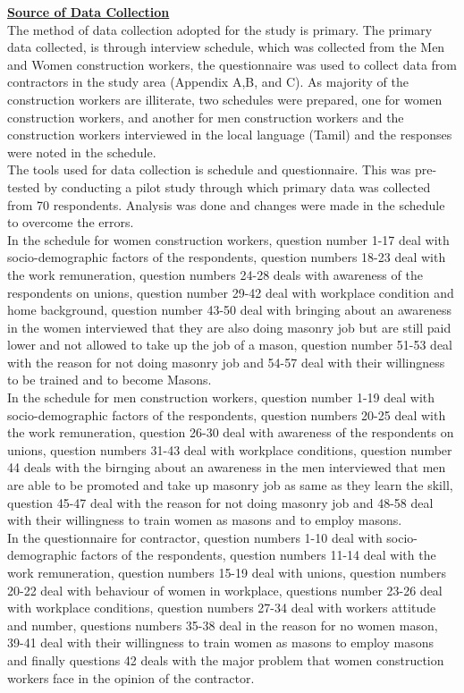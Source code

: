 \documentclass[12pt]{report}
\newcommand{\ubt}[1]{\textbf{\underline{#1}}}
\newcommand{\NI}{\noindent}
\begin{document}
	\NI\ubt{Source of Data Collection}\\
	The method of data collection adopted for the study is primary. The primary data collected, is through interview schedule, which was collected from the Men and Women construction workers, the questionnaire was used to collect data from contractors in the study area (Appendix A,B, and C). As majority of the construction workers are illiterate, two schedules were prepared, one for women construction workers, and another for men construction workers and the construction workers interviewed in the local language (Tamil) and the responses were noted in the schedule.\\
	
	\NI The tools used for data collection is schedule and questionnaire. This was pre-tested by conducting a pilot study through which primary data was collected from 70 respondents. Analysis was done and changes were made in the schedule to overcome the errors. \\
	
	\NI In the schedule for women construction workers, question number 1-17 deal with socio-demographic factors of the respondents, question numbers 18-23 deal with the work remuneration, question numbers 24-28 deals with awareness of the respondents on unions, question number 29-42 deal with workplace condition and home background, question number 43-50 deal with bringing about an awareness in the women interviewed that they are also doing masonry job but are still paid lower and not allowed to take up the job of a mason, question number 51-53 deal with the reason for not doing masonry job and 54-57 deal with their willingness to be trained and to become Masons.\\
	
	\NI In the schedule for men construction workers, question number 1-19 deal with socio-demographic factors of the respondents, question numbers 20-25 deal with the work remuneration, question 26-30 deal with awareness of the respondents on unions, question numbers 31-43 deal with workplace conditions, question number 44 deals with the birnging about an awareness in the men interviewed that men are able to be promoted and take up masonry job as same as they learn the skill, question 45-47 deal with the reason for not doing masonry job and 48-58 deal with their willingness to train women as masons and to employ masons.\\
	
	\NI In the questionnaire for contractor, question numbers 1-10 deal with socio-demographic factors of the respondents, question numbers 11-14 deal with the work remuneration, question numbers 15-19 deal with unions, question numbers 20-22 deal with behaviour of women in workplace, questions number 23-26 deal with workplace conditions, question numbers 27-34 deal with workers attitude and number, questions numbers 35-38 deal in the reason for no women mason, 39-41 deal with their willingness to train women as masons to employ masons and finally questions 42 deals with the major problem that women construction workers face in the opinion of the contractor.\\
	
\end{document}
